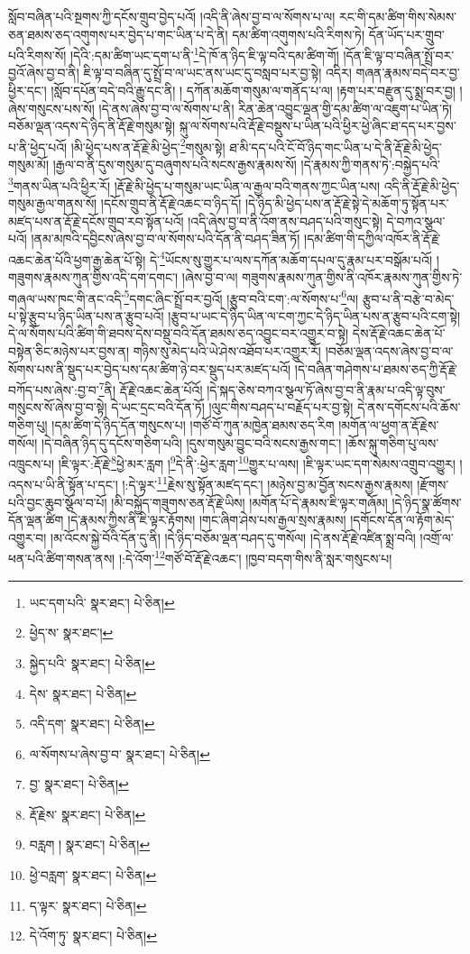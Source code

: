 སློབ་བཞིན་པའི་སྔགས་ཀྱི་དངོས་གྲུབ་བྱེད་པའོ། །འདི་ནི་ཞེས་བྱ་བ་ལ་སོགས་པ་ལ། རང་གི་དམ་ཚིག་གིས་སེམས་ཅན་ཐམས་ཅད་འགུགས་པར་བྱེད་པ་གང་ཡིན་པ་དེ་ནི། དམ་ཚིག་འགུགས་པའི་རིགས་ཏེ། དོན་ཡོད་པར་གྲུབ་པའི་རིགས་སོ། །དེའི་:དམ་ཚིག་ཡང་དག་པ་ནི་\footnote{ཡང་དག་པའི་  སྣར་ཐང་།  པེ་ཅིན། }དེ་ཁོ་ན་ཉིད་ཇི་ལྟ་བའི་དམ་ཚིག་གོ། །དོན་ཇི་ལྟ་བ་བཞིན་སྤྲོ་བར་བྱའོ་ཞེས་བྱ་བ་ནི། ཇི་ལྟ་བ་བཞིན་དུ་སྤྲོ་བ་ལ་ཡང་ནས་ཡང་དུ་བསླབ་པར་བྱ་སྟེ། འདིར། གཞན་རྣམས་བདེ་བར་བྱ་ཕྱིར་དང་། །སློབ་དཔོན་བདེ་བའི་རྒྱུ་དང་ནི། །
དཀོན་མཆོག་གསུམ་ལ་གནོད་པ་ལ། །རྟག་པར་བརྫུན་དུ་སྨྲ་བར་བྱ། །ཞེས་གསུངས་པས་སོ། །དེ་ནས་ཞེས་བྱ་བ་ལ་སོགས་པ་ནི། རིན་ཆེན་འབྱུང་ལྡན་གྱི་དམ་ཚིག་ལ་འཇུག་པ་ཡིན་ཏེ། བཅོམ་ལྡན་འདས་དེ་ཉིད་ནི་རྡོ་རྗེ་གསུམ་སྟེ། སྐུ་ལ་སོགས་པའི་རྡོ་རྗེ་བསྡུས་པ་ཡིན་པའི་ཕྱིར་ཕྱེ་ཞིང་ཐ་དད་པར་བྱས་པ་ནི་ཕྱེད་པའོ། །མི་ཕྱེད་པས་ན་རྡོ་རྗེ་མི་ཕྱེད་\footnote{ཕྱེད་ས་  སྣར་ཐང་། }གསུམ་སྟེ། ཐ་མི་དད་པའི་ངོ་བོ་ཉིད་གང་ཡིན་པ་དེ་ནི་རྡོ་རྗེ་མི་ཕྱེད་གསུམ་མོ། །རྒྱལ་བ་ནི་དུས་གསུམ་དུ་བཞུགས་པའི་སངས་རྒྱས་རྣམས་སོ། །དེ་རྣམས་ཀྱི་གནས་ཏེ་:བསྐྱེད་པའི་\footnote{སྐྱེད་པའི་  སྣར་ཐང་།  པེ་ཅིན། }གནས་ཡིན་པའི་ཕྱིར་རོ། །རྡོ་རྗེ་མི་ཕྱེད་པ་གསུམ་ཡང་ཡིན་ལ་རྒྱལ་བའི་གནས་ཀྱང་ཡིན་པས། འདི་ནི་རྡོ་རྗེ་མི་ཕྱེད་གསུམ་རྒྱལ་གནས་སོ། །དངོས་གྲུབ་ནི་རྡོ་རྗེ་འཆང་བ་ཉིད་དོ། །དེ་ཉིད་མི་ཕྱེད་པས་ན་རྡོ་རྗེ་སྟེ་དེ་མཆོག་ཏུ་སྟོན་པར་མཛད་པས་ན་རྡོ་རྗེ་དངོས་གྲུབ་རབ་སྟོན་པའོ། །འདི་ཞེས་བྱ་བ་ནི་འོག་ནས་བཤད་པའི་གསུང་སྟེ། དེ་བཀའ་སྩལ་པའོ། །ནམ་མཁའི་དབྱིངས་ཞེས་བྱ་བ་ལ་སོགས་པའི་དོན་ནི་བཤད་ཟིན་ཏོ། །དམ་ཚིག་གི་དཀྱིལ་འཁོར་ནི་རྡོ་རྗེ་འཆང་ཆེན་པོའི་ཕྱག་རྒྱ་ཆེན་པོ་སྟེ། དེ་\footnote{དེས་  སྣར་ཐང་།  པེ་ཅིན། }ཡོངས་སུ་གྱུར་པ་ལས་དཀོན་མཆོག་དཔལ་དུ་རྣམ་པར་བསྒོམ་པའོ། །གཟུགས་རྣམས་ཀུན་གྱིས་འདི་དག་དགང་། །ཞེས་བྱ་བ་ལ། གཟུགས་རྣམས་ཀུན་གྱིས་ནི་འཁོར་རྣམས་ཀུན་གྱིས་ཏེ་གཞལ་ཡས་ཁང་གི་ནང་འདི་\footnote{འདི་དག་  སྣར་ཐང་།  པེ་ཅིན། }དགང་ཞིང་སྤྲོ་བར་བྱའོ། །རྩུབ་བའི་ངག་:ལ་སོགས་པ་\footnote{ལ་སོགས་པ་ཞེས་བྱ་བ་  སྣར་ཐང་།  པེ་ཅིན། }ལ། རྩུབ་པ་ནི་བརྩེ་བ་མེད་པ་སྟེ་རྩུབ་པ་ཉིད་ཡིན་པས་ན་རྩུབ་པའོ། །རྩུབ་པ་ཡང་དེ་ཉིད་ཡིན་ལ་ངག་ཀྱང་དེ་ཉིད་ཡིན་པས་ན་རྩུབ་པའི་ངག་སྟེ། དེ་ལ་སོགས་པའི་ཚིག་གི་ཐབས་དེས་བསྡུ་བའི་དོན་ཐམས་ཅད་འབྱུང་བར་འགྱུར་བ་སྟེ། དེས་རྡོ་རྗེ་འཆང་ཆེན་པོ་བསྟེན་ཅིང་མཉེས་པར་བྱས་ན། གཉིས་སུ་མེད་པའི་ཡེ་ཤེས་འཐོབ་པར་འགྱུར་རོ། །བཅོམ་ལྡན་འདས་ཞེས་བྱ་བ་ལ་སོགས་པས་ནི་སྡུད་པར་བྱེད་པས་དམ་ཚིག་ཉེ་བར་སྡུད་པར་མཛད་པའོ། །དེ་བཞིན་གཤེགས་པ་ཐམས་ཅད་ཀྱི་རྡོ་རྗེ་བཀོད་པས་ཞེས་:བྱ་བ་\footnote{བྱ་  སྣར་ཐང་།  པེ་ཅིན། }ནི། རྡོ་རྗེ་འཆང་ཆེན་པོའོ། །དེ་སྐད་ཅེས་བཀའ་སྩལ་ཏོ་ཞེས་བྱ་བ་ནི་རྣམ་པ་འདི་ལྟ་བུས་གསུངས་སོ་ཞེས་བྱ་བ་སྟེ། དེ་ཡང་དྲང་བའི་དོན་ཏོ། །ལུང་གིས་བཤད་པ་བརྗོད་པར་བྱ་སྟེ། དེ་ནས་དགོངས་པའི་ཆོས་གཅིག་པུ། །དམ་ཚིག་དེ་ཉིད་དོན་གསུངས་པ། །གཙོ་བོ་ཀུན་མཁྱེན་ཐམས་ཅད་རིག །མགོན་ལ་ཕྱག་ན་རྡོ་རྗེས་གསོལ། །དེ་བཞིན་ཉིད་དུ་དངོས་གཅིག་པའི། །དུས་གསུམ་བྱུང་བའི་སངས་རྒྱས་གང་། །ཆོས་སྐུ་གཅིག་པུ་ལས་འཁྲུངས་པ། །ཇི་ལྟར་:རྡོ་རྗེ་\footnote{རྡོ་རྗེས་  སྣར་ཐང་།  པེ་ཅིན། }ཕྱེ་མར་རླག །\footnote{བརླག །  སྣར་ཐང་།  པེ་ཅིན། }དེ་ནི་:ཕྱེར་རླག་\footnote{ཕྱེ་བརླག་  སྣར་ཐང་།  པེ་ཅིན། }གྱུར་པ་ལས། །ཇི་ལྟར་ཡང་དག་སེམས་འགྲུབ་འགྱུར། །འདས་པ་ཡི་ནི་སྟོན་པ་དང་། །:དེ་ལྟར་\footnote{ད་ལྟར་  སྣར་ཐང་།  པེ་ཅིན། }རྗེས་སུ་སྟོན་མཛད་དང་། །མཉེས་བྱ་མ་བྱོན་སངས་རྒྱས་རྣམས། །རྫོགས་པའི་བྱང་ཆུབ་སྩོལ་བ་པོ། །མི་བསྐྱོད་གཟུགས་ཅན་རྡོ་རྗེ་ཡིས། །མགོན་པོ་དེ་རྣམས་ཇི་ལྟར་གཞོམ། །དེ་ཉིད་སྣ་ཚོགས་དོན་ལྡན་ཚིག །དེ་རྣམས་ཀྱིས་ནི་ཇི་ལྟར་རྟོགས། །གང་ཞིག་ཤེས་པས་རྒྱལ་སྲས་རྣམས། །དགོངས་དོན་ལ་རྟོག་མེད་འགྱུར་བ། །མ་འོངས་སྐྱེ་བོའི་དོན་དུ་ནི། །དེ་ཉིད་བཅོམ་ལྡན་བཤད་དུ་གསོལ། །དེ་ནས་རྡོ་རྗེ་འཛིན་སྨྲ་བའི། །འགྲོ་ལ་ཕན་པའི་ཚིག་གསན་ནས། །:དེ་འོག་\footnote{དེ་འོག་ཏུ་  སྣར་ཐང་།  པེ་ཅིན། }གཙོ་བོ་རྡོ་རྗེ་འཆང་། །ཁྱབ་བདག་གིས་ནི་སླར་གསུངས་པ། 
